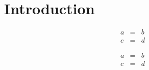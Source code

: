 \section{Introduction} 
\begin{eqnarray}
a & = & b\\
c & = & d
\end{eqnarray}

\begin{eqnarray}
a & = & b \label{a}\\
c & = & d
\end{eqnarray}

